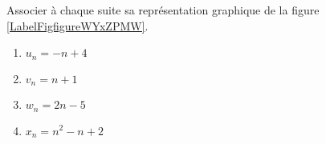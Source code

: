 
\begin{exercice}\label{exosmath-0291}

    Associer à chaque suite sa représentation graphique de la figure \ref{LabelFigfigureWYxZPMW}. %
    \begin{multicols}{2}
        \begin{enumerate}
            \item
                \( u_n=-n+4\)
            \item
                \( v_n=n+1\)
            \item
                \( w_n=2n-5\)
            \item
                \( x_n=n^2-n+2\)
        \end{enumerate}
    \end{multicols}
    
    \newcommand{\CaptionFigfigureWYxZPMW}{Les graphiques de l'exercice \ref{exosmath-0291}}


\end{exercice}
